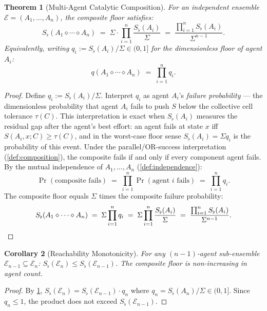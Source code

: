 \documentclass[twocolumn,11pt,a4paper]{article}
\newtheorem{theorem}{Theorem}[section]
\newtheorem{corollary}[theorem]{Corollary}
\theoremstyle{remark}
\newcommand{\Sflat}{S_{\flat}}
\newcommand{\tol}{\tau}
\newcommand{\Compose}{\diamond}           %
\newcommand{\Ens}{\mathcal{E}}            %
\begin{document}
\begin{theorem}[Multi-Agent Catalytic Composition]
\label{thm:composition}
For an independent ensemble $\Ens = (A_1, \ldots, A_n)$, the composite
floor satisfies:
\[
  \Sflat(A_1 \Compose \cdots \Compose A_n)
  \;=\; \Sigma \cdot \prod_{i=1}^n \frac{\Sflat(A_i)}{\Sigma}
  \;=\; \frac{\prod_{i=1}^n \Sflat(A_i)}{\Sigma^{n-1}}.
\]
Equivalently, writing $q_i := \Sflat(A_i)/\Sigma \in (0,1]$ for the
\emph{dimensionless floor} of agent $A_i$:
\[
  q(A_1 \Compose \cdots \Compose A_n) \;=\; \prod_{i=1}^n q_i.
\]
\end{theorem}
\begin{proof}
Define $q_i := \Sflat(A_i)/\Sigma$.  Interpret $q_i$ as agent $A_i$'s
\emph{failure probability} — the dimensionless probability that agent $A_i$
fails to push $S$ below the collective cell tolerance $\tol(C)$.  This
interpretation is exact when $\Sflat(A_i)$ measures the residual gap after
the agent's best effort: an agent fails at state $x$ iff $S(A_i, x; C) \ge
\tol(C)$, and in the worst-case floor sense $\Sflat(A_i) = \Sigma q_i$ is
the probability of this event.  Under the parallel/OR-success interpretation
(\cref{def:composition}), the composite fails if and only if every component
agent fails.  By the mutual independence of $A_1, \ldots, A_n$
(\cref{def:independence}):
\[
  \Pr(\text{composite fails}) \;=\; \prod_{i=1}^n \Pr(\text{agent } i \text{ fails})
  \;=\; \prod_{i=1}^n q_i.
\]
The composite floor equals $\Sigma$ times the composite failure probability:
\[
  \Sflat(A_1 \Compose \cdots \Compose A_n)
  \;=\; \Sigma \prod_{i=1}^n q_i
  \;=\; \Sigma \prod_{i=1}^n \frac{\Sflat(A_i)}{\Sigma}
  \;=\; \frac{\prod_{i=1}^n \Sflat(A_i)}{\Sigma^{n-1}}. \qedhere
\]
\end{proof}

\begin{corollary}[Reachability Monotonicity]
\label{cor:reach-monotone}
For any $(n-1)$-agent sub-ensemble $\Ens_{n-1} \subseteq \Ens_n$:
$\Sflat(\Ens_n) \le \Sflat(\Ens_{n-1})$.
The composite floor is non-increasing in agent count.
\end{corollary}
\begin{proof}
By \cref{thm:composition}, $\Sflat(\Ens_n) = \Sflat(\Ens_{n-1}) \cdot q_n$
where $q_n = \Sflat(A_n)/\Sigma \in (0,1]$.  Since $q_n \le 1$, the product
does not exceed $\Sflat(\Ens_{n-1})$.
\end{proof}
\end{document}
